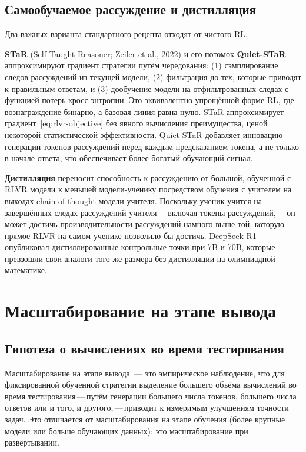 \subsection{Самообучаемое рассуждение и дистилляция}
\label{subsec:star-distill}

Два важных варианта стандартного рецепта отходят от чистого RL.

\textbf{STaR} (Self-Taught Reasoner; Zeiler et al., 2022)
и его потомок \textbf{Quiet-STaR} аппроксимируют
градиент стратегии путём чередования: (1) сэмплирование следов рассуждений
из текущей модели, (2) фильтрация до тех, которые приводят к правильным
ответам, и (3) дообучение модели на отфильтрованных следах с
функцией потерь кросс-энтропии. Это эквивалентно упрощённой форме RL, где
вознаграждение бинарно, а базовая линия равна нулю. STaR аппроксимирует
градиент~\eqref{eq:rlvr-objective} без явного вычисления преимущества, ценой
некоторой статистической эффективности.
Quiet-STaR добавляет инновацию генерации токенов рассуждений перед
каждым предсказанием токена, а не только в начале ответа,
что обеспечивает более богатый обучающий сигнал.

\textbf{Дистилляция} переносит
способность к рассуждению от большой, обученной с RLVR модели к меньшей
модели-ученику посредством обучения с учителем на выходах
chain-of-thought модели-учителя. Поскольку ученик учится на завершённых следах
рассуждений учителя\,---\,включая токены рассуждений,\,---\,он может
достичь производительности рассуждений намного выше той, которую прямое RLVR
на самом ученике позволило бы достичь. DeepSeek R1 опубликовал
дистиллированные контрольные точки при 7B и 70B, которые превзошли свои аналоги
того же размера без дистилляции на олимпиадной математике.

\section{Масштабирование на этапе вывода}
\label{sec:inference-scaling}

\subsection{Гипотеза о вычислениях во время тестирования}

Масштабирование на этапе вывода~--- это
эмпирическое наблюдение, что для фиксированной обученной стратегии выделение большего
объёма вычислений во время тестирования\,---\,путём генерации большего числа токенов, большего числа
ответов или и того, и другого,\,---\,приводит к измеримым улучшениям точности задач.
Это отличается от масштабирования на этапе обучения (более крупные модели
или больше обучающих данных): это масштабирование при развёртывании.

